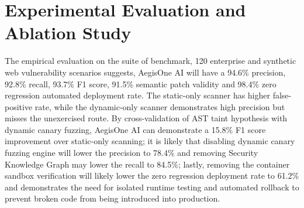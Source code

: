 \documentclass[journal,twoside]{IEEEtran}
\begin{document}
\section{Experimental Evaluation and Ablation Study}
The empirical evaluation on the suite of benchmark, 120 enterprise and synthetic web vulnerability scenarios suggests, AegisOne AI will have a 94.6\% precision, 92.8\% recall, 93.7\% F1 score, 91.5\% semantic patch validity and 98.4\% zero regression automated deployment rate. The static-only scanner has higher false-positive rate, while the dynamic-only scanner demonstrates high precision but misses the unexercised route. By cross-validation of AST taint hypothesis with dynamic canary fuzzing, AegisOne AI can demonstrate a 15.8\% F1 score improvement over static-only scanning; it is likely that disabling dynamic canary fuzzing engine will lower the precision to 78.4\% and removing Security Knowledge Graph may lower the recall to 84.5\%; lastly, removing the container sandbox verification will likely lower the zero regression deployment rate to 61.2\% and demonstrates the need for isolated runtime testing and automated rollback to prevent broken code from being introduced into production.
\end{document}
